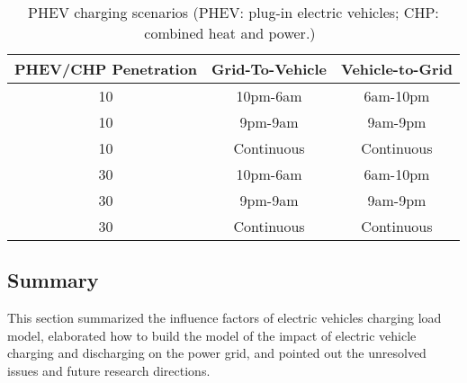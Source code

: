 \begin{table}[t]
	\caption{PHEV charging scenarios (PHEV: plug-in electric vehicles; CHP: combined heat and power.)~\cite{YC_Green,YC_Acha}}
	\centering
	\begin{tabular}{|c||c|c|}		
		\hline
		PHEV/CHP Penetration & Grid-To-Vehicle & Vehicle-to-Grid \\
		\hline \hline 
		10  & 10pm-6am & 6am-10pm \\
		\hline
		10 & 9pm-9am    & 9am-9pm \\
		\hline
		10 & Continuous & Continuous \\
		\hline
		30 & 10pm-6am   & 6am-10pm \\
		\hline
		30 & 9pm-9am    & 9am-9pm \\
		\hline
		30 & Continuous & Continuous \\	
		\hline			
	\end{tabular}		
	\label{tab_v2G}
\end{table}

\subsection{Summary}
This section summarized the influence factors of electric vehicles charging load model, elaborated how to build the model of the impact of electric vehicle charging and discharging on the power grid, and pointed out the unresolved issues and future research directions.



